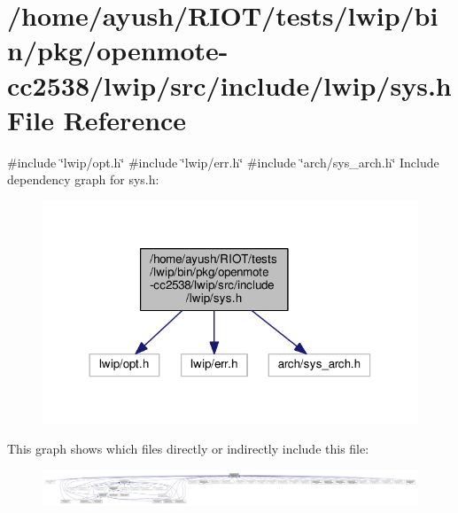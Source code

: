 \hypertarget{openmote-cc2538_2lwip_2src_2include_2lwip_2sys_8h}{}\section{/home/ayush/\+R\+I\+O\+T/tests/lwip/bin/pkg/openmote-\/cc2538/lwip/src/include/lwip/sys.h File Reference}
\label{openmote-cc2538_2lwip_2src_2include_2lwip_2sys_8h}
{\ttfamily \#include \char`\"{}lwip/opt.\+h\char`\"{}}\newline
{\ttfamily \#include \char`\"{}lwip/err.\+h\char`\"{}}\newline
{\ttfamily \#include \char`\"{}arch/sys\+\_\+arch.\+h\char`\"{}}\newline
Include dependency graph for sys.\+h\+:
\nopagebreak
\begin{figure}[H]
\begin{center}
\leavevmode
\includegraphics[width=318pt]{openmote-cc2538_2lwip_2src_2include_2lwip_2sys_8h__incl}
\end{center}
\end{figure}
This graph shows which files directly or indirectly include this file\+:
\nopagebreak
\begin{figure}[H]
\begin{center}
\leavevmode
\includegraphics[width=350pt]{openmote-cc2538_2lwip_2src_2include_2lwip_2sys_8h__dep__incl}
\end{center}
\end{figure}
